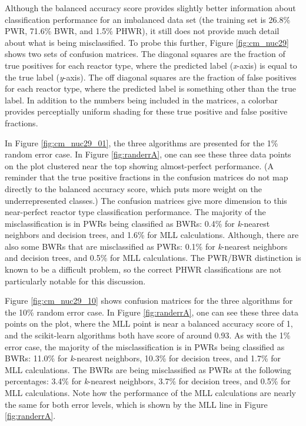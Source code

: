 Although the balanced accuracy score provides slightly better information about
classification performance for an imbalanced data set (the training set is
26.8\% \gls{PWR}, 71.6\% \gls{BWR}, and 1.5\% \gls{PHWR}), it still does not
provide much detail about what is being misclassified. To probe this further,
Figure \ref{fig:cm_nuc29} shows two sets of confusion matrices.  The diagonal
squares are the fraction of true positives for each reactor type, where the
predicted label (\textit{x}-axis) is equal to the true label (\textit{y}-axis).
The off diagonal squares are the fraction of false positives for each reactor
type, where the predicted label is something other than the true label. In
addition to the numbers being included in the matrices, a colorbar provides
perceptially uniform shading for these true positive and false positive
fractions. 

In Figure \ref{fig:cm_nuc29_01}, the three algorithms are presented for the 1\%
random error case. In Figure \ref{fig:randerrA}, one can see these three data
points on the plot clustered near the top showing almost-perfect performance.
(A reminder that the true positive fractions in the confusion matrices do not
map directly to the balanced accuracy score, which puts more weight on the
underrepresented classes.) The confusion matrices give more dimension to this
near-perfect reactor type classification performance. The majority of the
misclassification is in \gls{PWR}s being classified as \gls{BWR}s: 0.4\% for
\textit{k}-nearest neighbors and decision trees, and 1.6\% for \gls{MLL}
calculations. Although, there are also some \gls{BWR}s that are misclassified
as \gls{PWR}s: 0.1\% for \textit{k}-nearest neighbors and decision trees, and
0.5\% for \gls{MLL} calculations. The \gls{PWR}/\gls{BWR} distinction is known
to be a difficult problem, so the correct \gls{PHWR}
classifications are not particularly notable for this discussion.

Figure \ref{fig:cm_nuc29_10} shows confusion matrices for the three algorithms
for the 10\% random error case. In Figure \ref{fig:randerrA}, one can see these
three data points on the plot, where the \gls{MLL} point is near a balanced
accuracy score of 1, and the scikit-learn algorithms both have score of around
0.93. As with the 1\% error case, the majority of the misclassification is in
\gls{PWR}s being classified as \gls{BWR}s: 11.0\% for \textit{k}-nearest
neighbors, 10.3\% for decision trees, and 1.7\% for \gls{MLL} calculations.
The \gls{BWR}s are being misclassified as \gls{PWR}s at the following
percentages: 3.4\% for \textit{k}-nearest neighbors, 3.7\% for decision trees,
and 0.5\% for \gls{MLL} calculations. Note how the performance of the \gls{MLL}
calculations are nearly the same for both error levels, which is shown by the 
\gls{MLL} line in Figure \ref{fig:randerrA}.

